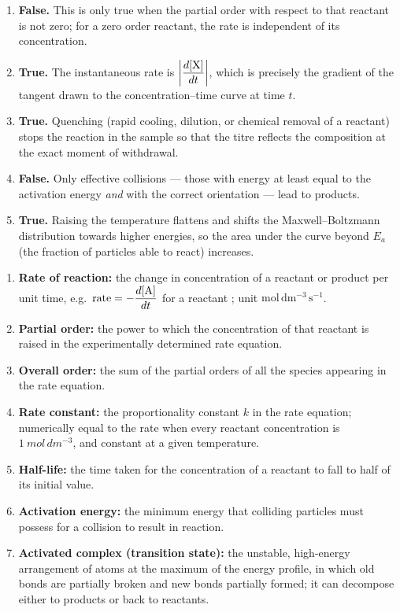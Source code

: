 \documentclass[11pt]{article}
\newcommand{\cle}[1]{{\popxbold\color{popdark}#1}}
\begin{document}
\begin{corrige}
\begin{enumerate}
\item \textbf{False.} This is only true when the partial order with respect to that reactant is not zero; for a zero order reactant, the rate is independent of its concentration.
\item \textbf{True.} The instantaneous rate is $\left|\dfrac{d[\ce{X}]}{dt}\right|$, which is precisely the gradient of the tangent drawn to the concentration--time curve at time $t$.
\item \textbf{True.} Quenching (rapid cooling, dilution, or chemical removal of a reactant) stops the reaction in the sample so that the titre reflects the composition at the exact moment of withdrawal.
\item \textbf{False.} Only \cle{effective collisions} — those with energy at least equal to the activation energy \emph{and} with the correct orientation — lead to products.
\item \textbf{True.} Raising the temperature flattens and shifts the Maxwell--Boltzmann distribution towards higher energies, so the area under the curve beyond $E_a$ (the fraction of particles able to react) increases.
\end{enumerate}
\end{corrige}

\begin{corrige}
\begin{enumerate}
\item \textbf{Rate of reaction:} the change in concentration of a reactant or product per unit time, e.g.\ $\text{rate} = -\dfrac{d[\ce{A}]}{dt}$ for a reactant ; unit $\mathrm{mol\,dm^{-3}\,s^{-1}}$.
\item \textbf{Partial order:} the power to which the concentration of that reactant is raised in the experimentally determined rate equation.
\item \textbf{Overall order:} the sum of the partial orders of all the species appearing in the rate equation.
\item \textbf{Rate constant:} the proportionality constant $k$ in the rate equation; numerically equal to the rate when every reactant concentration is $\SI{1}{mol\,dm^{-3}}$, and constant at a given temperature.
\item \textbf{Half-life:} the time taken for the concentration of a reactant to fall to half of its initial value.
\item \textbf{Activation energy:} the minimum energy that colliding particles must possess for a collision to result in reaction.
\item \textbf{Activated complex (transition state):} the unstable, high-energy arrangement of atoms at the maximum of the energy profile, in which old bonds are partially broken and new bonds partially formed; it can decompose either to products or back to reactants.
\end{enumerate}
\end{corrige}
\end{document}
